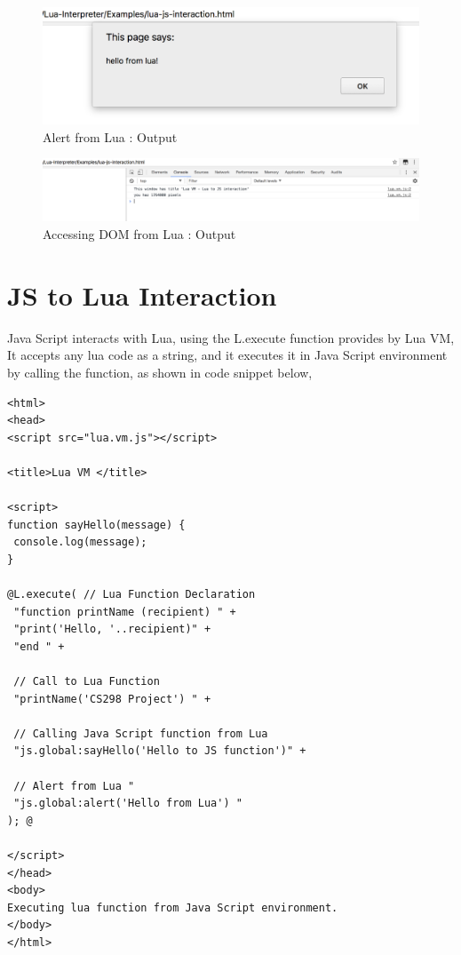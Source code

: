 \begin{figure}[H]
	\begin{center}
		\includegraphics[width=\linewidth]{./images/alert-from-lua.png}
	\end{center}
	\caption{Alert from Lua : Output}
	\label{fig:alert-from-lua}
\end{figure}

\begin{figure}[H]
	\begin{center}
		\includegraphics[width=\linewidth]{./images/printing-document-title.png}
	\end{center}
	\caption{Accessing DOM from Lua : Output}
	\label{fig:printing-document-title}
\end{figure}

\section{JS to Lua Interaction}

Java Script interacts with Lua, using the L.execute function provides by Lua VM, It accepts any lua code as a string, and it executes it in Java Script environment by calling the function, as shown in code snippet below, 


\begin{lstlisting}[frame=single, style=base]
<html>
<head>
<script src="lua.vm.js"></script>

<title>Lua VM </title>

<script>
function sayHello(message) {
 console.log(message);
}

@L.execute( // Lua Function Declaration
 "function printName (recipient) " +
 "print('Hello, '..recipient)" +
 "end " +

 // Call to Lua Function
 "printName('CS298 Project') " +

 // Calling Java Script function from Lua 
 "js.global:sayHello('Hello to JS function')" +

 // Alert from Lua " 
 "js.global:alert('Hello from Lua') "
); @

</script>
</head>
<body>
Executing lua function from Java Script environment.
</body>
</html>
\end{lstlisting}

